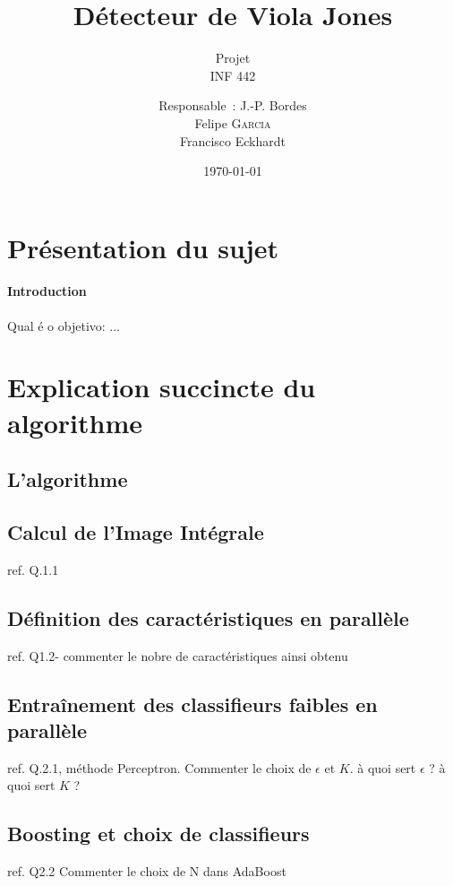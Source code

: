 \documentclass[a4paper, 12pt,twoside]{article}
\title{Détecteur de Viola Jones}
\subtitle{Projet \\ INF 442}
\author{
	Responsable~: J.-P. Bordes \\
        Felipe \textsc{Garcia} \\
        Francisco Eckhardt \\
        }
\date\today
\begin{document}
    \maketitle
    \renewcommand{\baselinestretch}{1.1}
    \setlength{\parskip}{0.5em}
    \tableofcontents
    \clearpage

\section{Présentation du sujet}

\paragraph{Introduction} 
Qual é o objetivo: ...\\

\clearpage

\section{Explication succincte du algorithme}

\subsection{L'algorithme}

\subsection{Calcul de l'Image Intégrale}
ref. Q.1.1

\subsection{Définition des caractéristiques en parallèle}
ref. Q1.2- commenter le nobre de caractéristiques ainsi obtenu

\subsection{Entraînement des classifieurs faibles en parallèle}
ref. Q.2.1, méthode Perceptron.
 Commenter le choix de $\epsilon$ et $K$. à quoi sert $\epsilon$ ? à quoi sert $K$ ?

\subsection{Boosting et choix de classifieurs}
ref. Q2.2 Commenter le choix de N dans AdaBoost
\end{document}
